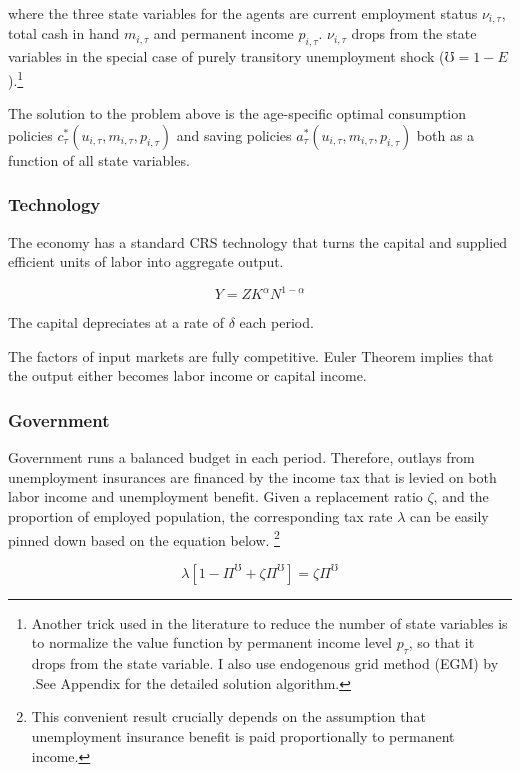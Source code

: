 where the three state variables for the agents are current employment status $\nu_{i,\tau}$,  total cash in hand $m_{i,\tau}$ and permanent income $p_{i,\tau}$.  $\nu_{i,\tau}$ drops from the state variables in the special case of purely transitory unemployment shock ($\mho = 1-E$).\footnote{Another trick used in the literature to reduce the number of state variables is to normalize the value function by permanent income level $p_\tau$, so that it drops from the state variable. I also use endogenous grid method (EGM) by \cite{carroll2006method}.See Appendix for the detailed solution algorithm.}

The solution to the problem above is the age-specific optimal consumption policies  $c_\tau^*(u_{i,\tau},m_{i,\tau},p_{i,\tau})$ and saving policies $a_\tau^*(u_{i,\tau},m_{i,\tau},p_{i,\tau})$ both as a function of all state variables. 

\subsubsection{Technology}

The economy has a standard CRS technology that turns the capital and supplied efficient units of labor into aggregate output. 

\begin{equation}
    Y = Z K^{\alpha} N^{1-\alpha}
\end{equation}

The capital depreciates at a rate of $\delta$ each period. 

The factors of input markets are fully competitive. Euler Theorem implies that the output either becomes labor income or capital income. 

\subsubsection{Government}

Government runs a balanced budget in each period. Therefore, outlays from unemployment insurances are financed by the income tax that is levied on both labor income and unemployment benefit. Given a replacement ratio $\zeta$, and the proportion of employed population, the corresponding tax rate $\lambda$ can be easily pinned down based on the equation below. \footnote{This convenient result crucially depends on the assumption that unemployment insurance benefit is paid proportionally to permanent income.}

\begin{equation}
\label{Eq:gov}
    \lambda \left[ 1-\Pi^\mho  + \zeta \Pi^\mho \right]  = \zeta \Pi^\mho   
\end{equation}

